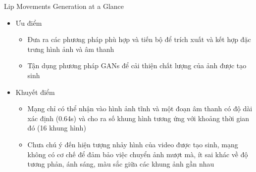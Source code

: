 \begin{frame}{Lip Movements Generation at a Glance}
    \begin{itemize}
        \item Ưu điểm
        \begin{itemize}
            \item Đưa ra các phương pháp phù hợp và tiến bộ để trích xuất và kết hợp đặc trưng hình ảnh và âm thanh
            \item Tận dụng phương pháp GANs để cải thiện chất lượng của ảnh
            được tạo sinh
        \end{itemize}
        \item Khuyết điểm
        \begin{itemize}
            \item Mạng chỉ có thể nhận vào hình ảnh tĩnh và một đoạn âm thanh có độ dài xác định (0.64s) và cho ra số khung hình tương ứng với khoảng thời gian đó (16 khung hình)
            \item Chưa chú ý đến hiện tượng nhảy hình của video được tạo sinh, mạng không có cơ chế để đảm bảo việc chuyển ảnh mượt mà, ít sai khác về độ tương phản, ánh sáng, màu sắc giữa các khung ảnh gần nhau
        \end{itemize}
    \end{itemize}
\end{frame}

